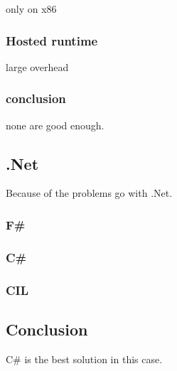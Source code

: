 only on x86\cite{mono_c++cli}

\subsubsection*{Hosted runtime}
large overhead

\subsubsection*{conclusion}
none are good enough.


\subsection{.Net}
Because of the problems go with .Net.
\subsubsection*{F\#}
\subsubsection*{C\#}
\subsubsection*{CIL}


\subsection{Conclusion}
C\# is the best solution in this case.
